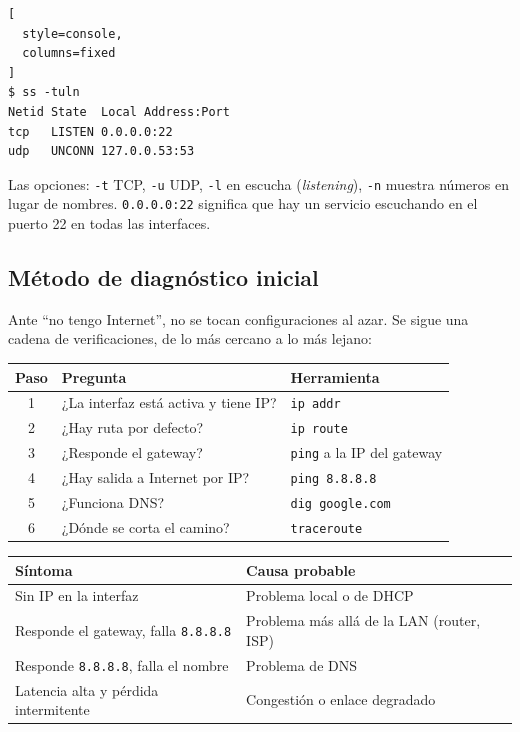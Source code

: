\documentclass[11pt,a4paper]{article}
\theoremstyle{definition}
\theoremstyle{remark}
\newcommand{\cmd}[1]{\texttt{#1}}
\begin{document}
\begin{lstlisting}[
  style=console,
  columns=fixed
]
$ ss -tuln
Netid State  Local Address:Port
tcp   LISTEN 0.0.0.0:22
udp   UNCONN 127.0.0.53:53
\end{lstlisting}

Las opciones: \texttt{-t} TCP, \texttt{-u} UDP, \texttt{-l} en escucha (\textit{listening}), \texttt{-n} muestra números en lugar de nombres. \texttt{0.0.0.0:22} significa que hay un servicio escuchando en el puerto 22 en todas las interfaces.

\subsection{Método de diagnóstico inicial}

Ante ``no tengo Internet'', no se tocan configuraciones al azar. Se sigue una cadena de verificaciones, de lo más cercano a lo más lejano:

\begin{center}
\begin{tabular}{@{}clp{5.5cm}@{}}
\toprule
\textbf{Paso} & \textbf{Pregunta} & \textbf{Herramienta}\\
\midrule
1 & ¿La interfaz está activa y tiene IP? & \cmd{ip addr}\\
2 & ¿Hay ruta por defecto? & \cmd{ip route}\\
3 & ¿Responde el gateway? & \cmd{ping} a la IP del gateway\\
4 & ¿Hay salida a Internet por IP? & \cmd{ping 8.8.8.8}\\
5 & ¿Funciona DNS? & \cmd{dig google.com}\\
6 & ¿Dónde se corta el camino? & \cmd{traceroute}\\
\bottomrule
\end{tabular}
\end{center}

\begin{center}
\begin{tabular}{@{}p{6cm}p{8cm}@{}}
\toprule
\textbf{Síntoma} & \textbf{Causa probable}\\
\midrule
Sin IP en la interfaz & Problema local o de DHCP\\
Responde el gateway, falla \texttt{8.8.8.8} & Problema más allá de la LAN (router, ISP)\\
Responde \texttt{8.8.8.8}, falla el nombre & Problema de DNS\\
Latencia alta y pérdida intermitente & Congestión o enlace degradado\\
\bottomrule
\end{tabular}
\end{center}
\end{document}

